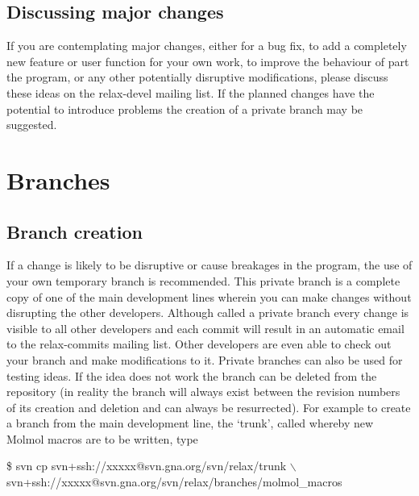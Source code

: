 \subsection{Discussing major changes}

If you are contemplating major changes, either for a bug fix, to add a completely new feature or user function for your own work, to improve the behaviour of part the program, or any other potentially disruptive modifications, please discuss these ideas on the rela\mbox{x-d}evel mailing list.
If the planned changes have the potential to introduce problems the creation of a private branch may be suggested.



\section{Branches}


\subsection{Branch creation}

If a change is likely to be disruptive or cause breakages in the program, the use of your own temporary branch is recommended.
This private branch is a complete copy of one of the main development lines wherein you can make changes without disrupting the other developers.
Although called a private branch every change is visible to all other developers and each commit will result in an automatic email to the relax-commits mailing list.
Other developers are even able to check out your branch and make modifications to it.
Private branches can also be used for testing ideas.
If the idea does not work the branch can be deleted from the repository (in reality the branch will always exist between the revision numbers of its creation and deletion and can always be resurrected).
For example to create a branch from the main development line, the `trunk', called  whereby new Molmol macros are to be written, type

\begin{exampleenv}
\$ svn cp svn+ssh://xxxxx@svn.gna.org/svn/relax/trunk $\backslash$ \\
 svn+ssh://xxxxx@svn.gna.org/svn/relax/branches/molmol\_macros
\end{exampleenv}

